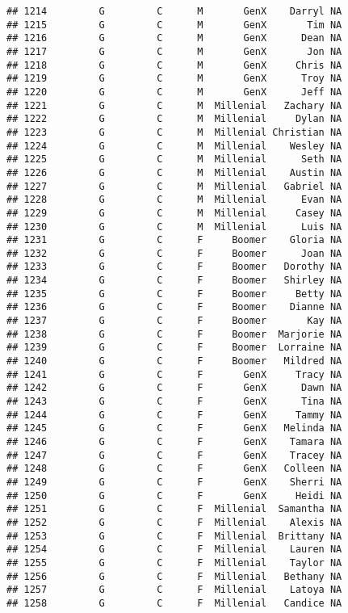 \documentclass[
]{article}
\begin{document}
\begin{verbatim}
## 1214         G         C      M       GenX    Darryl NA
## 1215         G         C      M       GenX       Tim NA
## 1216         G         C      M       GenX      Dean NA
## 1217         G         C      M       GenX       Jon NA
## 1218         G         C      M       GenX     Chris NA
## 1219         G         C      M       GenX      Troy NA
## 1220         G         C      M       GenX      Jeff NA
## 1221         G         C      M  Millenial   Zachary NA
## 1222         G         C      M  Millenial     Dylan NA
## 1223         G         C      M  Millenial Christian NA
## 1224         G         C      M  Millenial    Wesley NA
## 1225         G         C      M  Millenial      Seth NA
## 1226         G         C      M  Millenial    Austin NA
## 1227         G         C      M  Millenial   Gabriel NA
## 1228         G         C      M  Millenial      Evan NA
## 1229         G         C      M  Millenial     Casey NA
## 1230         G         C      M  Millenial      Luis NA
## 1231         G         C      F     Boomer    Gloria NA
## 1232         G         C      F     Boomer      Joan NA
## 1233         G         C      F     Boomer   Dorothy NA
## 1234         G         C      F     Boomer   Shirley NA
## 1235         G         C      F     Boomer     Betty NA
## 1236         G         C      F     Boomer    Dianne NA
## 1237         G         C      F     Boomer       Kay NA
## 1238         G         C      F     Boomer  Marjorie NA
## 1239         G         C      F     Boomer  Lorraine NA
## 1240         G         C      F     Boomer   Mildred NA
## 1241         G         C      F       GenX     Tracy NA
## 1242         G         C      F       GenX      Dawn NA
## 1243         G         C      F       GenX      Tina NA
## 1244         G         C      F       GenX     Tammy NA
## 1245         G         C      F       GenX   Melinda NA
## 1246         G         C      F       GenX    Tamara NA
## 1247         G         C      F       GenX    Tracey NA
## 1248         G         C      F       GenX   Colleen NA
## 1249         G         C      F       GenX    Sherri NA
## 1250         G         C      F       GenX     Heidi NA
## 1251         G         C      F  Millenial  Samantha NA
## 1252         G         C      F  Millenial    Alexis NA
## 1253         G         C      F  Millenial  Brittany NA
## 1254         G         C      F  Millenial    Lauren NA
## 1255         G         C      F  Millenial    Taylor NA
## 1256         G         C      F  Millenial   Bethany NA
## 1257         G         C      F  Millenial    Latoya NA
## 1258         G         C      F  Millenial   Candice NA

\end{verbatim}
\end{document}
